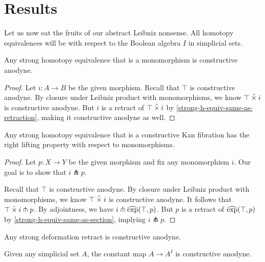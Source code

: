 \documentclass[reqno,10pt,a4paper,oneside]{amsart}
\begin{document}
\section{Results}

Let us now eat the fruits of our abstract Leibniz nonsense.
All homotopy equivalences will be with respect to the Boolean algebra $I$ in simplicial sets.

\begin{lemma}
\label{strong-h-equiv-mono-is-anodyne}
Any strong homotopy equivalence that is a monomorphism is constructive anodyne.
\end{lemma}

\begin{proof}
Let $i : A \to B$ be the given morphism.
Recall that $\top$ is constructive anodyne.
By closure under Leibniz product with monomorphisms, we know $\top \mathbin{\hat{\times}} i$ is constructive anodyne.
But $i$ is a retract of $\top \mathbin{\hat{\times}} i$ by \cref{strong-h-equiv-same-as-retraction}, making it constructive anodyne as well.
\end{proof}

\begin{lemma}
Any strong homotopy equivalence that is a constructive Kan fibration has the right lifting property with respect to monomorphisms.
\end{lemma}

\begin{proof}
Let $p : X \to Y$ be the given morphism and fix any monomorphism $i$.
Our goal is to show that $i \pitchfork p$.

Recall that $\top$ is constructive anodyne.
By closure under Leibniz product with monomorphisms, we know $\top \mathbin{\hat{\times}} i$ is constructive anodyne.
It follows that $\top \mathbin{\hat{\times}} i \pitchfork p$.
By adjointness, we have $i \pitchfork \operatorname{\widehat{exp}}(\top, p)$.
But $p$ is a retract of $\operatorname{\widehat{exp}}(\top, p)$ by \cref{strong-h-equiv-same-as-section}, implying $i \pitchfork p$.
\end{proof}

\begin{corollary}
\label{strong-deformation-retract-is-anodyne}
Any strong deformation retract is constructive anodyne.
\end{corollary}

\begin{corollary}
\label{refl-is-anodyne}
Given any simplicial set $A$, the constant map $A \to A^I$ is constructive anodyne.
\end{corollary}
\end{document}
